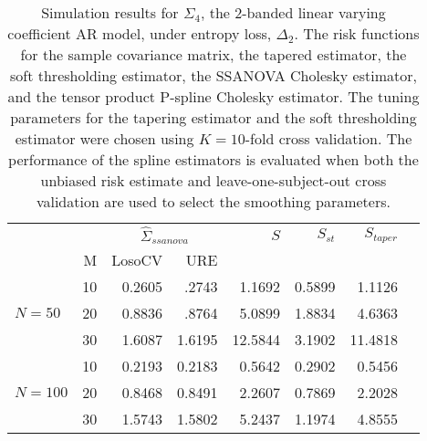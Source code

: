 \documentclass[12pt]{article}
\theoremstyle{definition}
\begin{document}
\begin{table}[ht]
\centering
\caption{Simulation results for $\Sigma_4$, the 2-banded linear varying coefficient AR model, under entropy loss, $\Delta_2$. The risk functions for the sample covariance matrix, the tapered estimator, the soft thresholding estimator, the SSANOVA Cholesky estimator, and the tensor product P-spline Cholesky estimator. The tuning parameters for the tapering estimator and the soft thresholding estimator were chosen using $K = 10$-fold cross validation. The performance of the spline estimators is evaluated when both the unbiased risk estimate and leave-one-subject-out cross validation are used to select the smoothing parameters.}
\begin{tabular}{l|r|rrrrrr}
&  & \multicolumn{2}{c}{$\hat{\Sigma}_{ssanova}$} & $S$ & $S_{st}$ & $S_{taper}$ \\ 
&M & \mbox{LosoCV} & \mbox{URE} &  \\ 
  \hline
&    10 & 0.2605 & .2743&  1.1692 & 0.5899 & 1.1126 \\ 
$N = 50$ &    20 & 0.8836 & .8764 & 5.0899 & 1.8834 & 4.6363 \\ 
   &    30 & 1.6087 & 1.6195 &12.5844&3.1902 & 11.4818 \\ \hdashline
 &    10 & 0.2193 & 0.2183 & 0.5642 & 0.2902 & 0.5456 \\ 
  $N = 100$ &    20 & 0.8468 & 0.8491 & 2.2607 & 0.7869 & 2.2028\\ 
   &    30 & 1.5743 & 1.5802 & 5.2437 & 1.1974 & 4.8555 \\
  \end{tabular}
\end{table}

\end{document}
